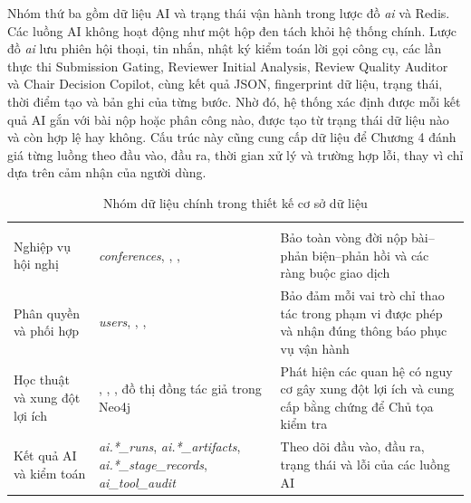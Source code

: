 Nhóm thứ ba gồm dữ liệu AI và trạng thái vận hành trong lược đồ \textit{ai} và Redis. Các luồng AI không hoạt động như một hộp đen tách khỏi hệ thống chính. Lược đồ \textit{ai} lưu phiên hội thoại, tin nhắn, nhật ký kiểm toán lời gọi công cụ, các lần thực thi Submission Gating, Reviewer Initial Analysis, Review Quality Auditor và Chair Decision Copilot, cùng kết quả JSON, fingerprint dữ liệu, trạng thái, thời điểm tạo và bản ghi của từng bước. Nhờ đó, hệ thống xác định được mỗi kết quả AI gắn với bài nộp hoặc phân công nào, được tạo từ trạng thái dữ liệu nào và còn hợp lệ hay không. Cấu trúc này cũng cung cấp dữ liệu để Chương 4 đánh giá từng luồng theo đầu vào, đầu ra, thời gian xử lý và trường hợp lỗi, thay vì chỉ dựa trên cảm nhận của người dùng.

\begingroup
\setlength{\tabcolsep}{2pt}
\renewcommand{\arraystretch}{1.15}
\begin{longtable}{|C{0.31\textwidth}|P{0.31\textwidth}|P{0.31\textwidth}|}
  \caption{Nhóm dữ liệu chính trong thiết kế cơ sở dữ liệu}\label{tab:ch3-db-groups}\\
  \hline
       &        &     \\ \hline
  \endfirsthead
  \hline
       &        &     \\ \hline
  \endhead
  Nghiệp vụ hội nghị   &   \textit{conferences}, , ,    &   Bảo toàn vòng đời nộp bài--phản biện--phản hồi và các ràng buộc giao dịch \\ \hline
  Phân quyền và phối hợp      &      \textit{users}, , ,       &      Bảo đảm mỗi vai trò chỉ thao tác trong phạm vi được phép và nhận đúng thông báo phục vụ vận hành \\ \hline
  Học thuật và xung đột lợi ích     &     , , , đồ thị đồng tác giả trong Neo4j     &     Phát hiện các quan hệ có nguy cơ gây xung đột lợi ích và cung cấp bằng chứng để Chủ tọa kiểm tra \\ \hline
  Kết quả AI và kiểm toán      &      \textit{ai.*\_runs}, \textit{ai.*\_artifacts}, \textit{ai.*\_stage\_records}, \textit{ai\_tool\_audit}      &      Theo dõi đầu vào, đầu ra, trạng thái và lỗi của các luồng AI \\ \hline
\end{longtable}
\endgroup

